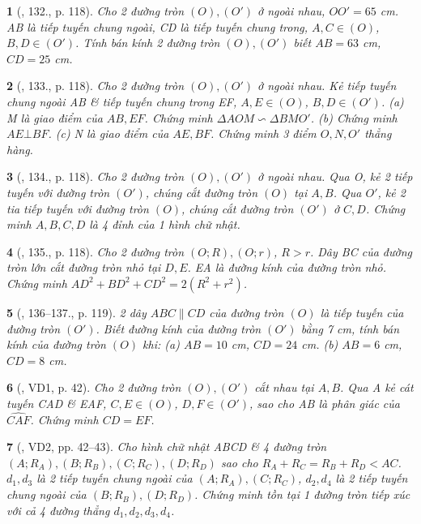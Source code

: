 \documentclass{article}
\newtheorem{baitoan}{}
\begin{document}
\begin{baitoan}[\cite{Binh_Toan_9_tap_1}, 132., p. 118]
	Cho 2 đường tròn $(O),(O')$ ở ngoài nhau, $OO' = 65$ {\rm cm}. AB là tiếp tuyến chung ngoài, CD là tiếp tuyến chung trong, $A,C\in(O)$, $B,D\in(O')$. Tính bán kính 2 đường tròn $(O),(O')$ biết $AB = 63$ {\rm cm}, $CD = 25$ {\rm cm}.
\end{baitoan}

\begin{baitoan}[\cite{Binh_Toan_9_tap_1}, 133., p. 118]
	Cho 2 đường tròn $(O),(O')$ ở ngoài nhau. Kẻ tiếp tuyến chung ngoài AB \& tiếp tuyến chung trong EF, $A,E\in(O)$, $B,D\in(O')$. (a) M là giao điểm của $AB,EF$. Chứng minh $\Delta AOM\backsim\Delta BMO'$. (b) Chứng minh $AE\bot BF$. (c) N là giao điểm của $AE,BF$. Chứng minh 3 điểm $O,N,O'$ thẳng hàng.
\end{baitoan}

\begin{baitoan}[\cite{Binh_Toan_9_tap_1}, 134., p. 118]
	Cho 2 đường tròn $(O),(O')$ ở ngoài nhau. Qua O, kẻ 2 tiếp tuyến với đường tròn $(O')$, chúng cắt đường tròn $(O)$ tại $A,B$. Qua $O'$, kẻ 2 tia tiếp tuyến với đường tròn $(O)$, chúng cắt đường tròn $(O')$ ở $C,D$. Chứng minh $A,B,C,D$ là 4 đỉnh của 1 hình chữ nhật.
\end{baitoan}

\begin{baitoan}[\cite{Binh_Toan_9_tap_1}, 135., p. 118]
	Cho 2 đường tròn $(O;R),(O;r)$, $R > r$. Dây BC của đường tròn lớn cắt đường tròn nhỏ tại $D,E$. EA là đường kính của đường tròn nhỏ. Chứng minh $AD^2 + BD^2 + CD^2 = 2(R^2 + r^2)$.
\end{baitoan}

\begin{baitoan}[\cite{Binh_Toan_9_tap_1}, 136--137., p. 119]
	2 dây $ABC\parallel CD$ của đường tròn $(O)$ là tiếp tuyến của đường tròn $(O')$. Biết đường kính của đường tròn $(O')$ bằng {\rm7 cm}, tính bán kính của đường tròn $(O)$ khi: (a) $AB = 10$ {\rm cm}, $CD = 24$ {\rm cm}. (b) $AB = 6$ {\rm cm}, $CD = 8$ {\rm cm}.
\end{baitoan}

\begin{baitoan}[\cite{TLCT_THCS_Toan_9_hinh_hoc}, VD1, p. 42]
	Cho 2 đường tròn $(O),(O')$ cắt nhau tại $A,B$. Qua A kẻ cát tuyến CAD \& EAF, $C,E\in(O)$, $D,F\in(O')$, sao cho AB là phân giác của $\widehat{CAF}$. Chứng minh $CD = EF$.
\end{baitoan}

\begin{baitoan}[\cite{TLCT_THCS_Toan_9_hinh_hoc}, VD2, pp. 42--43]
	Cho hình chữ nhật ABCD \& 4 đường tròn $(A;R_A),(B;R_B),(C;R_C),(D;R_D)$ sao cho $R_A + R_C = R_B + R_D < AC$. $d_1,d_3$ là 2 tiếp tuyến chung ngoài của $(A;R_A),(C;R_C)$, $d_2,d_4$ là 2 tiếp tuyến chung ngoài của $(B;R_B),(D;R_D)$. Chứng minh tồn tại 1 đường tròn tiếp xúc với cả 4 đường thẳng $d_1,d_2,d_3,d_4$.
\end{baitoan}
\end{document}
